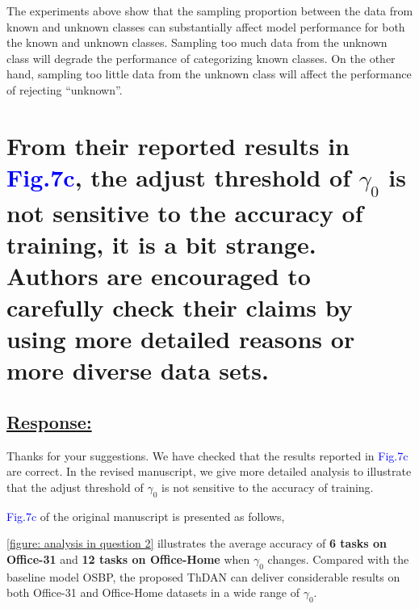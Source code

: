 The experiments above show that the sampling proportion between the data from known and unknown classes can substantially affect model performance for both the known and unknown classes.
Sampling too much data from the unknown class will degrade the performance of categorizing known classes.
On the other hand, sampling too little data from the unknown class will affect the performance of rejecting ``unknown''.

\section{From their reported results in \textcolor{blue}{Fig.7c}, the adjust threshold of $\gamma_0$ is not sensitive to the accuracy of training, it is a bit strange.
Authors are encouraged to carefully check their claims by using more detailed reasons or more diverse data sets. }
\label{Question: threshold}
\subsection*{\underline{\textbf{Response:}}}

Thanks for your suggestions.
We have checked that the results reported in \textcolor{blue}{Fig.7c} are correct.
In the revised manuscript, we give more detailed analysis to illustrate that the adjust threshold of $\gamma_0$ is not sensitive to the accuracy of training.

\textcolor{blue}{Fig.7c} of the original manuscript is presented as follows,

\newline
\figurename{\ref{figure: analysis in question 2}} illustrates the average accuracy of \textbf{6 tasks on Office-31} and \textbf{12 tasks on Office-Home} when $\gamma_0$ changes.
Compared with the baseline model OSBP, the proposed ThDAN can deliver considerable results on both Office-31 and Office-Home datasets in a wide range of $\gamma_0$.


